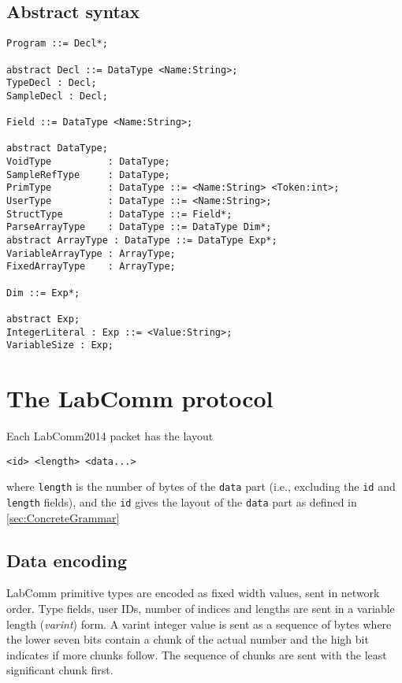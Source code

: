 \documentclass[a4paper]{article}
\begin{document}
\subsection{Abstract syntax}
\begin{verbatim}
Program ::= Decl*;

abstract Decl ::= DataType <Name:String>;
TypeDecl : Decl;
SampleDecl : Decl;

Field ::= DataType <Name:String>;

abstract DataType;
VoidType          : DataType;
SampleRefType     : DataType;
PrimType          : DataType ::= <Name:String> <Token:int>;
UserType          : DataType ::= <Name:String>;
StructType        : DataType ::= Field*;
ParseArrayType    : DataType ::= DataType Dim*;
abstract ArrayType : DataType ::= DataType Exp*;
VariableArrayType : ArrayType;
FixedArrayType    : ArrayType;

Dim ::= Exp*;

abstract Exp;
IntegerLiteral : Exp ::= <Value:String>;
VariableSize : Exp;
\end{verbatim}

\newpage
\section{The LabComm protocol}
\label{sec:ProtocolGrammar}

Each LabComm2014 packet has the layout
\begin{verbatim}
<id> <length> <data...>
\end{verbatim}
where \verb+length+ is the number of bytes of the \verb+data+ part
(i.e., excluding the \verb+id+ and \verb+length+ fields), and 
the \verb+id+ gives the layout of the \verb+data+ part as defined 
in \ref{sec:ConcreteGrammar}
\subsection{Data encoding}
LabComm primitive types are encoded as fixed width values, sent in
network order.  Type fields, user IDs, number of indices and lengths are
sent in a variable length (\emph{varint}) form.  A varint integer value
is sent as a sequence of bytes where the lower seven bits contain a
chunk of the actual number and the high bit indicates if more chunks
follow. The sequence of chunks are sent with the least significant chunk
first.  
\end{document}
